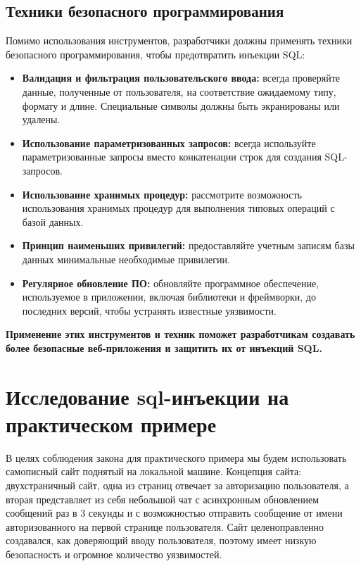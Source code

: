 \documentclass[a4paper,12pt]{diplom}
\begin{document}
	 \subsection{Техники безопасного программирования}
	 
	 Помимо использования инструментов,  разработчики должны применять техники безопасного программирования,  чтобы предотвратить инъекции SQL:
	 
	 \begin{itemize}
	 	\item \textbf{Валидация и фильтрация пользовательского ввода:}  всегда проверяйте данные,  полученные от пользователя,  на соответствие ожидаемому типу,  формату и длине.  Специальные символы должны быть экранированы или удалены. 
	 	\item \textbf{Использование параметризованных запросов:}  всегда используйте параметризованные запросы вместо конкатенации строк для создания SQL-запросов. 
	 	\item \textbf{Использование хранимых процедур:}  рассмотрите возможность использования хранимых процедур для выполнения типовых операций с базой данных. 
	 	\item \textbf{Принцип наименьших привилегий:}  предоставляйте учетным записям базы данных минимальные необходимые привилегии. 
	 	\item \textbf{Регулярное обновление ПО:}  обновляйте программное обеспечение,  используемое в приложении,  включая библиотеки и фреймворки,  до последних версий,  чтобы устранять известные уязвимости. 
	 \end{itemize}
	 	
	 \textbf{Применение этих инструментов и техник поможет разработчикам создавать более безопасные веб-приложения и защитить их от инъекций SQL.} 
	 
	 
	 
	 
	 \section{Исследование sql-инъекции на практическом примере}
	 
	 В целях соблюдения закона для практического примера мы будем использовать самописный сайт поднятый на локальной машине. Концепция сайта: двухстраничный сайт, одна из страниц отвечает за авторизацию пользователя, а вторая представляет из себя небольшой чат с асинхронным обновлением сообщений раз в 3 секунды и с возможностью отправить сообщение от имени авторизованного на первой странице пользователя. Сайт целеноправленно создавался, как доверяющий вводу пользователя, поэтому имеет низкую безопасность и огромное количество уязвимостей.
	 
\end{document}
